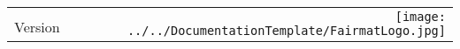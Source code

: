 \documentclass{article}
\begin{document}
\thispagestyle{plain}
\begin{center}
	\begin{tabular}{l|r}
		{\huge \pluginName} & \multirow{2}{*}{\texttt{[image: ../../DocumentationTemplate/FairmatLogo.jpg]}}\\
		{\huge Version \pluginVersion} &
	\end{tabular}
\end{center}
\vspace{2cm}
\end{document}
